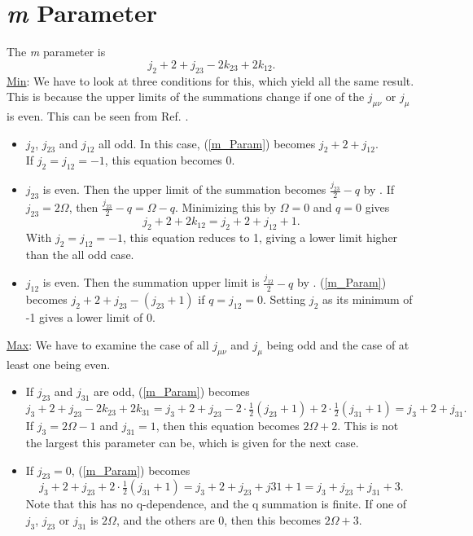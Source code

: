 \documentclass[main.tex]{subfiles}
\begin{document}
\section{\emph{m} Parameter}
The \emph{m} parameter is
\begin{equation}
	\label{m_Param}j_2 + 2 + j_{23} - 2 k_{23} + 2 k_{12}.
\end{equation}
\underline{Min}: 
We have to look at three conditions for this, which yield all the same result.  This is because the upper limits of the summations change if one of the $j_{\mu \nu}$ or $j_{\mu}$ is even.  This can be seen from Ref. \cite{Perkins1969}.
\begin{itemize}
	\item $j_2$, $j_{23}$ and $j_{12}$ all odd.  In this case, (\ref{m_Param}) becomes $j_2 + 2 + j_{12}.$ \\ If $j_2 = j_{12} = -1$, this equation becomes 0.
	\item $j_{23}$ is even.  Then the upper limit of the summation becomes $\frac{j_{23}}{2}-q$ by \cite{Perkins1969}.  If $j_{23} = 2 \Omega$, then $\frac{j_{23}}{2}-q = \Omega - q$.  Minimizing this by $\Omega = 0$ and $q = 0$ gives
	\[j_2 + 2 + 2 k_{12} = j_2 + 2 + j_{12} + 1.\]
	With $j_2 = j_{12} = -1$, this equation reduces to 1, giving a lower limit higher than the all odd case.
	\item $j_{12}$ is even.  Then the summation upper limit is $\frac{j_{12}}{2}-q$ by \cite{Perkins1969}.  (\ref{m_Param}) becomes $j_2 + 2 + j_{23} - (j_{23}+1)$ if $q = j_{12} = 0$.  Setting $j_2$ as its minimum of -1 gives a lower limit of 0.
\end{itemize}
\underline{Max}: We have to examine the case of all $j_{\mu \nu}$ and $j_{\mu}$ being odd and the case of at least one being even.
\begin{itemize}
  \item If $j_{23}$ and $j_{31}$ are odd, (\ref{m_Param}) becomes
\[j_3 + 2 + j_{23} - 2 k_{23} + 2 k_{31} = j_3 + 2 + j_{23} - 2\cdot\tfrac{1}{2} (j_{23} + 1) + 2\cdot\tfrac{1}{2} (j_{31} + 1) = j_{3} + 2 + j_{31}.\]
If $j_3 = 2\Omega - 1$ and $j_{31} = 1$, then this equation becomes $2\Omega + 2$.  This is not the largest this parameter can be, which is given for the next case.
  \item If $j_{23} = 0$, (\ref{m_Param}) becomes
  \[j_3 + 2 + j_{23} + 2\cdot\tfrac{1}{2}(j_{31}+1) = j_3 + 2 + j_{23} + j{31} + 1 = j_3 + j_{23} + j_{31} + 3.\]  Note that this has no q-dependence, and the q summation is finite.  If one of $j_3$, $j_{23}$ or $j_{31}$ is $2\Omega$, and the others are 0, then this becomes $2\Omega + 3$.
\end{itemize}
\end{document}
